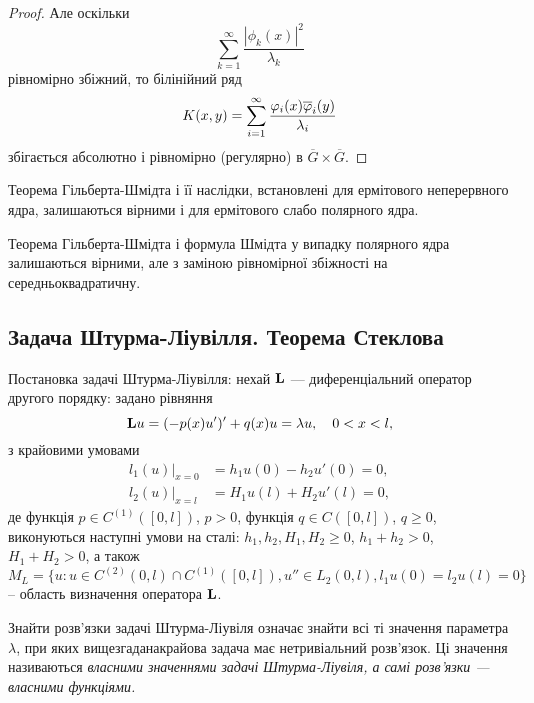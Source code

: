 \begin{proof}
    Але оскільки
    \begin{equation}
        \sum_{k=1}^\infty\frac{|\phi_k(x)|^2}{\lambda_k}
    \end{equation}
    рівномірно збіжний, то білінійний ряд
    \begin{equation}
        K(x,y)=\Sum_{i=1}^\infty\dfrac{\phi_i(x)\overline\phi_i(y)}{\lambda_i}
    \end{equation}
    збігається абсолютно і рівномірно (регулярно) в $\overline G\times\overline G$.
\end{proof}

\begin{remark}
    Теорема Гільберта-Шмідта і її наслідки, встановлені для ермітового неперервного ядра, залишаються вірними і для ермітового слабо полярного ядра.
\end{remark}

\begin{remark}
    Теорема Гільберта-Шмідта і формула Шмідта у випадку полярного ядра залишаються вірними, але з заміною рівномірної збіжності на середньоквадратичну.
\end{remark}

\subsection{Задача Штурма-Ліувілля. Теорема Стеклова}

Постановка задачі Штурма-Ліувілля: нехай $\bf{L}$ --- диференціальний оператор другого порядку: задано рівняння
\begin{equation}
    \bf{L}u=(-p(x)u')'+q(x)u=\lambda u,\quad0<x<l,
\end{equation}
з крайовими умовами
\begin{align}
    l_1(u)|_{x=0}&=h_1u(0)-h_2u'(0)=0,\\
    l_2(u)|_{x=l}&=H_1u(l)+H_2u'(l)=0,
\end{align}
де функція $p\in C^{(1)}([0,l])$, $p>0$, функція $q\in C([0,l])$, $q\ge0$, виконуються наступні умови на сталі: $h_1, h_2, H_1, H_2 \ge 0$, $h_1+h_2>0$, $H_1+H_2>0$,
а також
\begin{equation}
    M_L=\{u:u\in C^{(2)}(0,l)\cap C^{(1)}([0,l]), u''\in L_2(0,l), l_1u(0)=l_2u(l)=0\}
\end{equation}
-- область визначення оператора $\bf{L}$.

\begin{definition}
    Знайти розв'язки задачі Штурма-Ліувіля означає знайти всі ті значення параметра $\lambda$, при яких вищезгаданакрайова задача має нетривіальний розв'язок. Ці значення називаються \it{власними значеннями} задачі Штурма-Ліувіля, а самі розв'язки --- \it{власними функціями}.
\end{definition}


